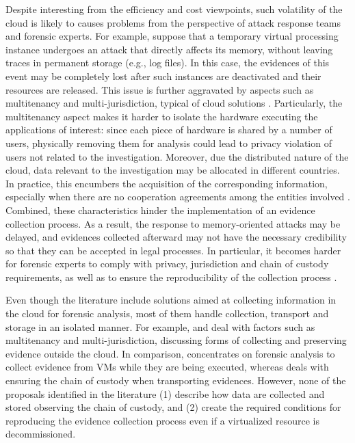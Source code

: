 \documentclass[conference]{IEEEtran}
\begin{document}
%
Despite interesting from the efficiency and cost viewpoints, such volatility of the cloud is likely to causes problems from the perspective of attack response teams and forensic experts.
%
For example, suppose that a temporary virtual processing instance undergoes an attack that directly affects its memory, without leaving traces in permanent storage (e.g., log files).
%
In this case, the evidences of this event may be completely lost after such instances are deactivated and their resources are released.
%
This issue is further aggravated by aspects such as multitenancy and multi-jurisdiction, typical of cloud solutions \cite{Bash_Adv_in_Forensics:2015}.
%
Particularly, the multitenancy aspect makes it harder to isolate the hardware executing the applications of interest: since each piece of hardware is shared by a number of users, physically removing them for analysis could lead to privacy violation of users not related to the investigation. 
%
Moreover, due the distributed nature of the cloud, data relevant to the investigation may be allocated in different countries.
%
In practice, this encumbers the acquisition of the corresponding information, especially when there are no cooperation agreements among the entities involved \cite{Dykstra_Acquiring_for_IAAS:2012}.
%
%
Combined, these characteristics hinder the implementation of an evidence collection process.
%
As a result, the response to memory-oriented attacks may be delayed, and evidences collected afterward may not have the necessary credibility so that they can be accepted in legal processes.
%
In particular, it becomes harder for forensic experts to comply with privacy, jurisdiction and chain of custody requirements, as well as to ensure the reproducibility of the collection process \cite{Rahman_Live_Forensics_Techniques:2015}.


%
Even though the literature include solutions aimed at collecting information in the cloud for forensic analysis, most of them handle collection, transport and storage in an isolated manner.
%
For example, \cite{Dykstra_FROST:2013} and \cite{Reichert_Auto_acquisition:2015} deal with factors such as multitenancy and multi-jurisdiction, discussing forms of collecting and preserving evidence outside the cloud.
%
In comparison, \cite{George_DF2CE:2012} concentrates on forensic analysis to collect evidence from VMs while they are being executed, whereas \cite{Sang_Log_approach:2013} deals with ensuring the chain of custody when transporting evidences.
%
However, none of the proposals identified in the literature (1) describe how data are collected and stored observing the chain of custody, and (2) create the required conditions for reproducing the evidence collection process even if a virtualized resource is decommissioned.
\end{document}
